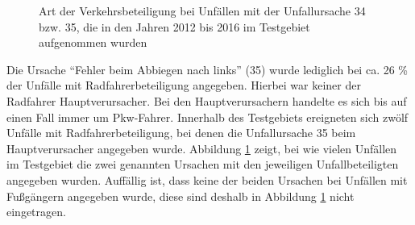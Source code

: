 \begin{savenotes}
	\begin{figure} [H]
		\caption[Art der Verkehrsbeteiligung bei Unfällen mit der Unfallursache 34 bzw. 35, die in den Jahren 2012 bis 2016 im Testgebiet aufgenommen wurden]{Art der Verkehrsbeteiligung bei Unfällen mit der Unfallursache 34 bzw. 35, die in den Jahren 2012 bis 2016 im Testgebiet aufgenommen wurden}\label{fig:Urs34/35_Verkehrsbeteiligung} 
	\end{figure}
\end{savenotes}

Die Ursache \enquote{Fehler beim Abbiegen nach links} (35) wurde lediglich bei ca. 26 \% der Unfälle mit Radfahrerbeteiligung angegeben. Hierbei war keiner der Radfahrer Hauptverursacher. Bei den Hauptverursachern handelte es sich bis auf einen Fall immer um Pkw-Fahrer. Innerhalb des Testgebiets ereigneten sich zwölf Unfälle mit Radfahrerbeteiligung, bei denen die Unfallursache 35 beim Hauptverursacher angegeben wurde. Abbildung \ref{fig:Urs34/35_Verkehrsbeteiligung} zeigt, bei wie vielen Unfällen im Testgebiet die zwei genannten Ursachen mit den jeweiligen Unfallbeteiligten angegeben wurden. Auffällig ist, dass keine der beiden Ursachen bei Unfällen mit Fußgängern angegeben wurde, diese sind deshalb in Abbildung \ref{fig:Urs34/35_Verkehrsbeteiligung} nicht eingetragen.

